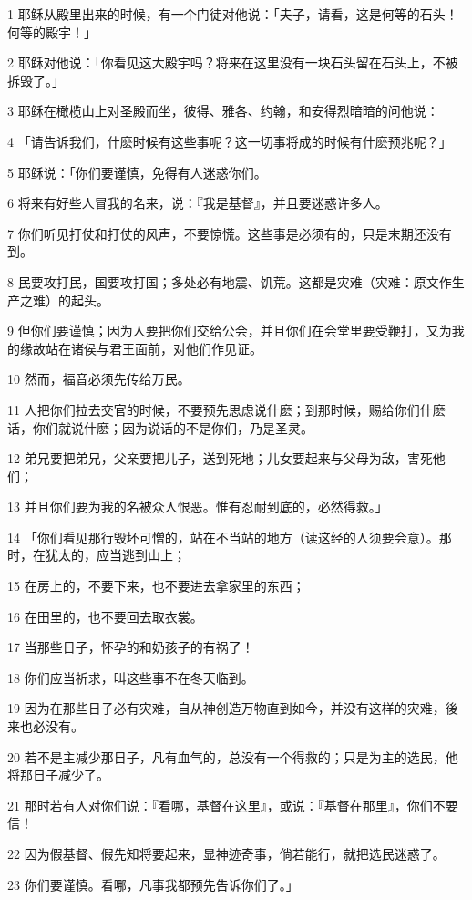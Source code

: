 \par 1 耶稣从殿里出来的时候，有一个门徒对他说：「夫子，请看，这是何等的石头！何等的殿宇！」
\par 2 耶稣对他说：「你看见这大殿宇吗？将来在这里没有一块石头留在石头上，不被拆毁了。」
\par 3 耶稣在橄榄山上对圣殿而坐，彼得、雅各、约翰，和安得烈暗暗的问他说：
\par 4 「请告诉我们，什麽时候有这些事呢？这一切事将成的时候有什麽预兆呢？」
\par 5 耶稣说：「你们要谨慎，免得有人迷惑你们。
\par 6 将来有好些人冒我的名来，说：『我是基督』，并且要迷惑许多人。
\par 7 你们听见打仗和打仗的风声，不要惊慌。这些事是必须有的，只是末期还没有到。
\par 8 民要攻打民，国要攻打国；多处必有地震、饥荒。这都是灾难（灾难：原文作生产之难）的起头。
\par 9 但你们要谨慎；因为人要把你们交给公会，并且你们在会堂里要受鞭打，又为我的缘故站在诸侯与君王面前，对他们作见证。
\par 10 然而，福音必须先传给万民。
\par 11 人把你们拉去交官的时候，不要预先思虑说什麽；到那时候，赐给你们什麽话，你们就说什麽；因为说话的不是你们，乃是圣灵。
\par 12 弟兄要把弟兄，父亲要把儿子，送到死地；儿女要起来与父母为敌，害死他们；
\par 13 并且你们要为我的名被众人恨恶。惟有忍耐到底的，必然得救。」
\par 14 「你们看见那行毁坏可憎的，站在不当站的地方（读这经的人须要会意）。那时，在犹太的，应当逃到山上；
\par 15 在房上的，不要下来，也不要进去拿家里的东西；
\par 16 在田里的，也不要回去取衣裳。
\par 17 当那些日子，怀孕的和奶孩子的有祸了！
\par 18 你们应当祈求，叫这些事不在冬天临到。
\par 19 因为在那些日子必有灾难，自从神创造万物直到如今，并没有这样的灾难，後来也必没有。
\par 20 若不是主减少那日子，凡有血气的，总没有一个得救的；只是为主的选民，他将那日子减少了。
\par 21 那时若有人对你们说：『看哪，基督在这里』，或说：『基督在那里』，你们不要信！
\par 22 因为假基督、假先知将要起来，显神迹奇事，倘若能行，就把选民迷惑了。
\par 23 你们要谨慎。看哪，凡事我都预先告诉你们了。」
